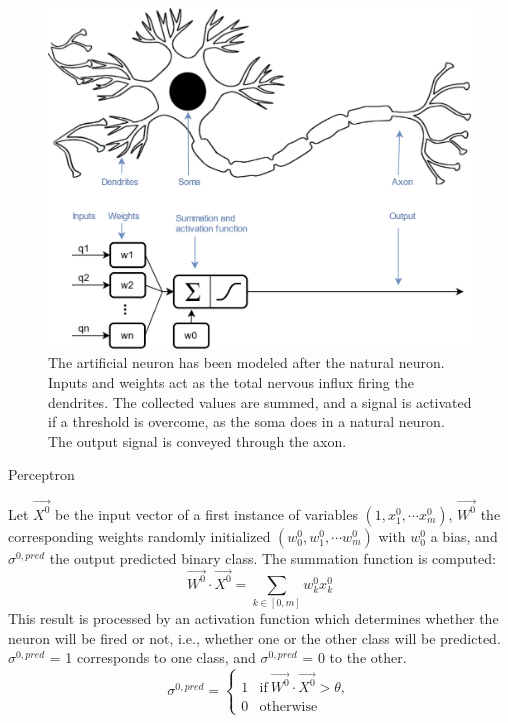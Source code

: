 \begin{figure}[!ht]
	\centering
	\def\svgwidth{1\columnwidth}
	\fontsize{10pt}{10pt}\selectfont
	\includegraphics[width=\linewidth]{"../Chap2/Figures/Fig_neuron.png"}
	\caption{The artificial neuron has been modeled after the natural neuron. Inputs and weights act as the total nervous influx firing the dendrites. The collected values are summed, and a signal is activated if a threshold is overcome, as the soma does in a natural neuron. The output signal is conveyed through the axon.}
	\label{fig_neuron}
\end{figure}

\begin{algorithm}[!ht]
      \caption{Perceptron}\label{alg:perceptron}
      \begin{algorithmic}[1]
        \STATEx Let \( \overrightarrow{X^0} \) be the input vector of a first instance of variables \( (1, x_1^0, \cdots x_m^0) \), \( \overrightarrow{W^0} \) the corresponding weights randomly initialized \( (w_0^0, w_1^0, \cdots w_m^0) \) with \(w_0^0\) a bias, and $\sigma^{0, pred}$ the output predicted binary class. 
        \STATE The summation function is computed: 
        \begin{equation}
            \overrightarrow{W^0} \cdot \overrightarrow{X^0} = \sum_{k \in [0,m]} w_k^0 x_k^0
        \end{equation}
        \STATE This result is processed by an activation function which determines whether the neuron will be fired or not, i.e., whether one or the other class will be predicted. $\sigma^{0,pred}$ = 1 corresponds to one class, and $\sigma^{0,pred}$ = 0 to the other. 
        \begin{equation}
            \sigma^{0,pred} = 
            \begin{cases}
                1 & \text{if} \ \overrightarrow{W^0} \cdot \overrightarrow{X^0} > \theta,\\
                0 & \text{otherwise}
            \end{cases}
        \end{equation}
      \end{algorithmic}
\end{algorithm}


